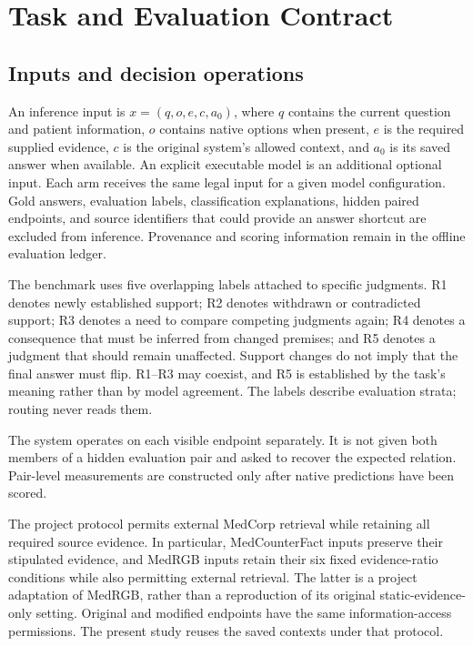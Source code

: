 \section{Task and Evaluation Contract}
\label{sec:task_contract}

\subsection{Inputs and decision operations}
\label{sec:task_contract-inputs-and-decision-operations}

An inference input is \(x=(q,o,e,c,a_0)\), where \(q\) contains the current question and
patient information, \(o\) contains native options when present, \(e\) is the required
supplied evidence, \(c\) is the original system's allowed context, and \(a_0\) is its
saved answer when available. An explicit executable model is an additional optional input.
Each arm receives the same legal input for a given model configuration. Gold answers,
evaluation labels, classification explanations, hidden paired endpoints, and source
identifiers that could provide an answer shortcut are excluded from inference. Provenance
and scoring information remain in the offline evaluation ledger.

The benchmark uses five overlapping labels attached to specific judgments. R1 denotes
newly established support; R2 denotes withdrawn or contradicted support; R3 denotes a need
to compare competing judgments again; R4 denotes a consequence that must be inferred from
changed premises; and R5 denotes a judgment that should remain unaffected. Support changes
do not imply that the final answer must flip. R1--R3 may coexist, and R5 is established by
the task's meaning rather than by model agreement. The labels describe evaluation strata;
routing never reads them.

The system operates on each visible endpoint separately. It is not given both members of a
hidden evaluation pair and asked to recover the expected relation. Pair-level measurements
are constructed only after native predictions have been scored.

The project protocol permits external MedCorp retrieval while retaining all required
source evidence. In particular, MedCounterFact inputs preserve their stipulated evidence,
and MedRGB inputs retain their six fixed evidence-ratio conditions while also permitting
external retrieval. The latter is a project adaptation of MedRGB, rather than a
reproduction of its original static-evidence-only setting. Original and modified endpoints
have the same information-access permissions. The present study reuses the saved contexts
under that protocol.

